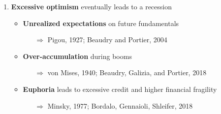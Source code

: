 \documentclass[hyperref={pdfpagelabels=false}]{beamer}
\begin{document}
{\begin{enumerate}
		
		\item \textbf{Excessive optimism} eventually leads to a recession
		\begin{itemize}
			\item \textbf{Unrealized expectations} on future fundamentals 
			\begin{itemize}
				\item[$\Rightarrow$] Pigou, 1927; Beaudry and Portier, 2004
			\end{itemize}
			\item \textbf{Over-accumulation} during booms 
			\begin{itemize}
				\item[$\Rightarrow$] von Mises, 1940; Beaudry, Galizia, and Portier, 2018
			\end{itemize}
			\item \textbf{Euphoria} leads to excessive credit and higher financial fragility 
			\begin{itemize}
			\item[$\Rightarrow$] Minsky, 1977; Bordalo, Gennaioli, Shleifer, 2018 
			\end{itemize}
		\end{itemize}
		


\end{enumerate}}
\end{document}
